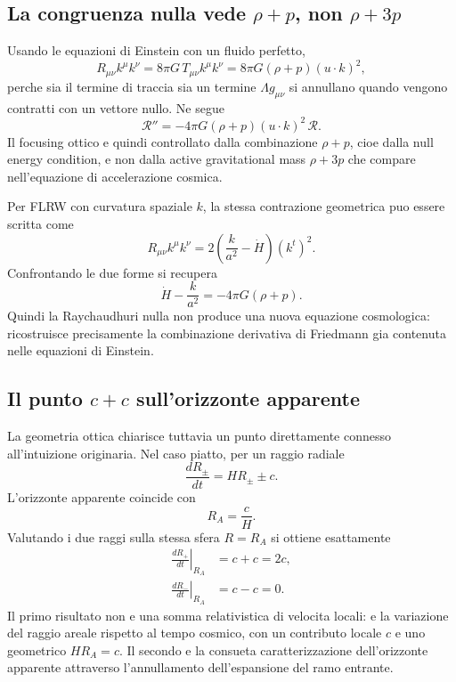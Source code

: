 \documentclass[11pt,a4paper]{article}
\begin{document}
\subsection{La congruenza nulla vede $\rho+p$, non $\rho+3p$}

Usando le equazioni di Einstein con un fluido perfetto,
\begin{equation}
 R_{\mu\nu}k^\mu k^\nu
 =8\pi G\,T_{\mu\nu}k^\mu k^\nu
 =8\pi G(\rho+p)(u\!\cdot\! k)^2,
 \label{eq:r12e_Rkk_fluid}
\end{equation}
perche sia il termine di traccia sia un termine $\Lambda g_{\mu\nu}$ si annullano quando vengono contratti con un vettore nullo. Ne segue
\begin{equation}
 \boxed{\quad
 \mathcal R''=-4\pi G(\rho+p)(u\!\cdot\! k)^2\,\mathcal R.
 \quad}
 \label{eq:r12e_focusing_rhop}
\end{equation}
Il focusing ottico e quindi controllato dalla combinazione $\rho+p$, cioe dalla null energy condition, e non dalla active gravitational mass $\rho+3p$ che compare nell'equazione di accelerazione cosmica.

Per FLRW con curvatura spaziale $k$, la stessa contrazione geometrica puo essere scritta come
\begin{equation}
 R_{\mu\nu}k^\mu k^\nu
 =2\left(\frac{k}{a^2}-\dot H\right)(k^t)^2.
 \label{eq:r12e_Rkk_Hdot}
\end{equation}
Confrontando le due forme si recupera
\begin{equation}
 \boxed{\quad
 \dot H-\frac{k}{a^2}=-4\pi G(\rho+p).
 \quad}
 \label{eq:r12e_derivative_friedmann}
\end{equation}
Quindi la Raychaudhuri nulla non produce una nuova equazione cosmologica: ricostruisce precisamente la combinazione derivativa di Friedmann gia contenuta nelle equazioni di Einstein.

\subsection{Il punto $c+c$ sull'orizzonte apparente}

La geometria ottica chiarisce tuttavia un punto direttamente connesso all'intuizione originaria. Nel caso piatto, per un raggio radiale
\begin{equation}
 \frac{dR_\pm}{dt}=HR_\pm\pm c.
\end{equation}
L'orizzonte apparente coincide con
\begin{equation}
 R_A=\frac{c}{H}.
\end{equation}
Valutando i due raggi sulla stessa sfera $R=R_A$ si ottiene esattamente
\begin{align}
 \left.\frac{dR_+}{dt}\right|_{R_A}&=c+c=\boxed{2c},\\
 \left.\frac{dR_-}{dt}\right|_{R_A}&=c-c=\boxed{0}.
 \label{eq:r12e_horizon_null_rates}
\end{align}
Il primo risultato non e una somma relativistica di velocita locali: e la variazione del raggio areale rispetto al tempo cosmico, con un contributo locale $c$ e uno geometrico $HR_A=c$. Il secondo e la consueta caratterizzazione dell'orizzonte apparente attraverso l'annullamento dell'espansione del ramo entrante.
\end{document}
